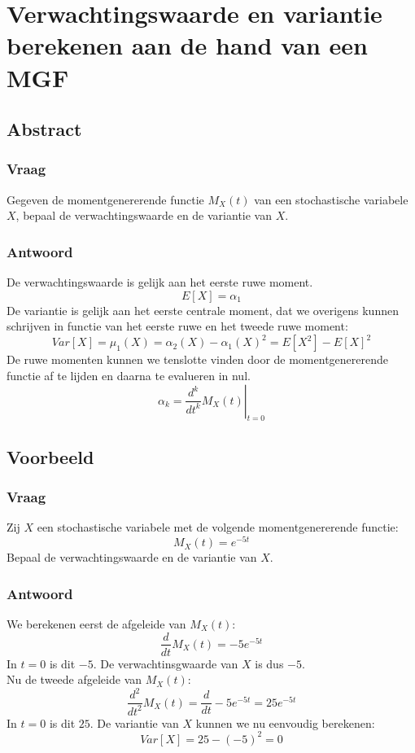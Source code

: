 \documentclass[main.tex]{subfiles}
\begin{document}
\newpage
\section{Verwachtingswaarde en variantie berekenen aan de hand van een MGF}
\subsection*{Abstract}
\subsubsection*{Vraag}
Gegeven de momentgenererende functie $M_{X}(t)$ van een stochastische variabele $X$, bepaal de verwachtingswaarde en de variantie van $X$.

\subsubsection*{Antwoord}
De verwachtingswaarde is gelijk aan het eerste ruwe moment.
\[ E[X] = \alpha_{1} \]
De variantie is gelijk aan het eerste centrale moment, dat we overigens kunnen schrijven in functie van het eerste ruwe en het tweede ruwe moment:
\[ Var[X] = \mu_{1}(X) = \alpha_{2}(X) - \alpha_{1}(X)^{2} = E[X^{2}] - E[X]^{2} \]
De ruwe momenten kunnen we tenslotte vinden door de momentgenererende functie af te lijden en daarna te evalueren in nul.
\[ \alpha_{k} = \left.\frac{d^{k}}{dt^{k}}M_{X}(t)\right|_{t=0} \]

\subsection*{Voorbeeld}
\subsubsection*{Vraag}
Zij $X$ een stochastische variabele met de volgende momentgenererende functie:
\[ M_{X}(t) = e^{-5t} \]
Bepaal de verwachtingswaarde en de variantie van $X$.

\subsubsection*{Antwoord}
We berekenen eerst de afgeleide van $M_{X}(t)$:
\[ \frac{d}{dt}M_{X}(t) = -5e^{-5t} \]
In $t=0$ is dit $-5$.
De verwachtinsgwaarde van $X$ is dus $-5$.\\
Nu de tweede afgeleide van $M_{X}(t)$:
\[ \frac{d^{2}}{dt^{2}}M_{X}(t) = \frac{d}{dt} -5e^{-5t} = 25e^{-5t} \]
In $t=0$ is dit $25$.
De variantie van $X$ kunnen we nu eenvoudig berekenen:
\[ Var[X] = 25 - (-5)^{2} = 0 \]
\end{document}
